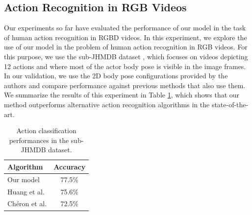 \subsection{Action Recognition in RGB Videos}
Our experiments so far have evaluated the performance of our model
in the task of human action recognition in RGBD videos.
In this experiment, we explore the use of our model in the problem of human
action recognition in RGB videos. For this purpose, we use the sub-JHMDB
dataset \cite{Jhuang2013}, which focuses on videos depicting 12 actions and
where most of the actor body pose is visible in the image frames.
In our validation, we use the 2D body pose configurations provided by the
authors and compare performance against previous methods that also use them.
We summarize the results of this experiment in Table \ref{tab:subjhmdb},
which shows that our method outperforms alternative action recognition algorithms
in the state-of-the-art.



\begin{table}[tb]
\footnotesize
\centering
\begin{tabular}{|l|c|}
\hline
\textbf{Algorithm} & \textbf{Accuracy}\\
\hline
Our model &  77.5\% \\
\hline
Huang et al. \cite{Jhuang2013} & 75.6\% \\
Ch\'eron et al. \cite{Cheron2015} & 72.5\%\\
\hline
\end{tabular}
\caption{\footnotesize
Action classification performances in the sub-JHMDB dataset.}
\label{tab:subjhmdb}
\vspace{-4mm}
\end{table}


